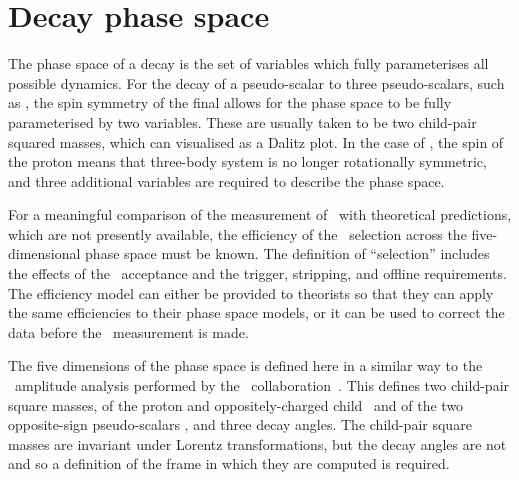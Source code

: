 \section{Decay phase space}
\label{chap:cpv:theory:phsp}

The phase space of a decay is the set of variables which fully parameterises 
all possible dynamics.
For the decay of a pseudo-scalar to three pseudo-scalars, such as 
\decay{\PDzero}{\PKshort\Ppiplus\Ppiminus}, the spin symmetry of the final 
allows for the phase space to be fully parameterised by two variables.
These are usually taken to be two child-pair squared masses, which can 
visualised as a Dalitz plot.
In the case of \LcTophh, the spin  of the proton means that 
three-body system is no longer rotationally symmetric, and three additional 
variables are required to describe the phase space.

For a meaningful comparison of the measurement of \dACP\ with theoretical 
predictions, which are not presently available, the efficiency of the 
\PLambdac\ selection across the five-dimensional phase space must be known.
The definition of ``selection'' includes the effects of the \lhcb\ acceptance 
and the trigger, stripping, and offline requirements.
The efficiency model can either be provided to theorists so that they can apply 
the same efficiencies to their phase space models, or it can be used to correct 
the data before the \dACP\ measurement is made.

The five dimensions of the phase space is defined here in a similar way to the 
\LcTopKpi\ amplitude analysis performed by the \esno\ 
collaboration~\cite{Aitala:1999uq}.
This defines two child-pair square masses, of the proton and oppositely-charged 
child \msqphm\ and of the two opposite-sign pseudo-scalars \msqhh, and three 
decay angles.
The child-pair square masses are invariant under Lorentz transformations, but 
the decay angles are not and so a definition of the frame in which they are 
computed is required.

